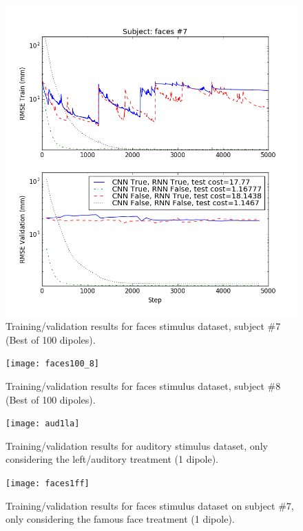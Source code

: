 \documentclass[journal]{IEEEtran}
\begin{document}
\begin{figure}[!h]
\centering
\includegraphics[width=6.75in]{faces100}
\caption{Training/validation results for faces stimulus dataset, subject \#7 (Best of 100 dipoles).}
\label{fig:faces100}
\end{figure}

\begin{figure}[!h]
\centering
\texttt{[image: faces100\_8]}
\caption{Training/validation results for faces stimulus dataset, subject \#8 (Best of 100 dipoles).}
\label{fig:faces100_8}
\end{figure}

\begin{figure}[!h]
\centering
\texttt{[image: aud1la]}
\caption{Training/validation results for auditory stimulus dataset, only considering the left/auditory treatment (1 dipole).}
\label{fig:aud1la}
\end{figure}


\begin{figure}[!h]
\centering
\texttt{[image: faces1ff]}
\caption{Training/validation results for faces stimulus dataset on subject \#7, only considering the famous face treatment (1 dipole).}
\label{fig:faces1ff}
\end{figure}
\end{document}
